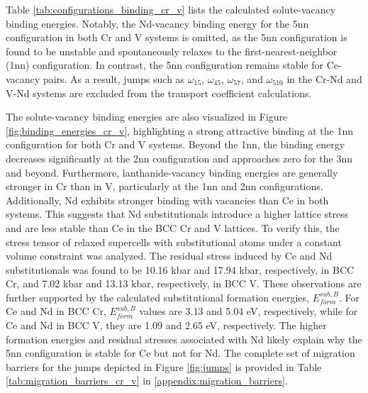 \documentclass[preprint,12pt]{elsarticle}
\begin{document}
Table \ref{tab:configurations_binding_cr_v} lists the calculated solute-vacancy binding energies. Notably, the Nd-vacancy binding energy for the 5nn configuration in both Cr and V systems is omitted, as the 5nn configuration is found to be unstable and spontaneously relaxes to the first-nearest-neighbor (1nn) configuration. In contrast, the 5nn configuration remains stable for Ce-vacancy pairs. As a result, jumps such as $\omega_{15}$, $\omega_{45}$, $\omega_{57}$, and $\omega_{510}$ in the Cr-Nd and V-Nd systems are excluded from the transport coefficient calculations.

The solute-vacancy binding energies are also visualized in Figure \ref{fig:binding_energies_cr_v}, highlighting a strong attractive binding at the 1nn configuration for both Cr and V systems. Beyond the 1nn, the binding energy decreases significantly at the 2nn configuration and approaches zero for the 3nn and beyond. Furthermore, lanthanide-vacancy binding energies are generally stronger in Cr than in V, particularly at the 1nn and 2nn configurations. Additionally, Nd exhibits stronger binding with vacancies than Ce in both systems. This suggests that Nd substitutionals introduce a higher lattice stress and are less stable than Ce in the BCC Cr and V lattices. To verify this, the stress tensor of relaxed supercells with substitutional atoms under a constant volume constraint was analyzed. The residual stress induced by Ce and Nd substitutionals was found to be 10.16 kbar and 17.94 kbar, respectively, in BCC Cr, and 7.02 kbar and 13.13 kbar, respectively, in BCC V. These observations are further supported by the calculated substitutional formation energies, $E_{form}^{sub, B}$. For Ce and Nd in BCC Cr, $E_{form}^{sub, B}$ values are 3.13 and 5.04 eV, respectively, while for Ce and Nd in BCC V, they are 1.09 and 2.65 eV, respectively. The higher formation energies and residual stresses associated with Nd likely explain why the 5nn configuration is stable for Ce but not for Nd. 
The complete set of migration barriers for the jumps depicted in Figure \ref{fig:jumps} is provided in Table \ref{tab:migration_barriers_cr_v} in \ref{appendix:migration_barriers}.
\end{document}
